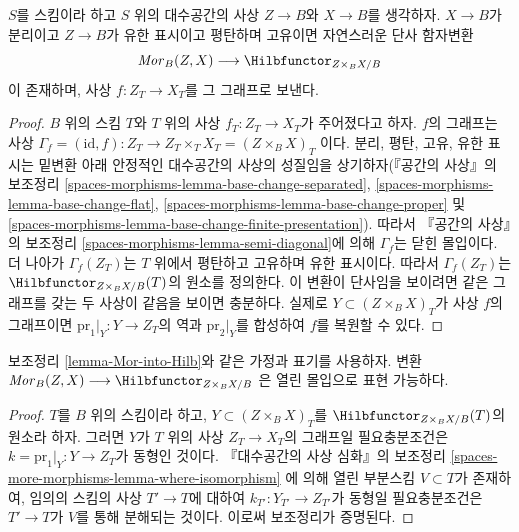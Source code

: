 \begin{lemma}
\label{lemma-Mor-into-Hilb}
$S$를 스킴이라 하고 $S$ 위의 대수공간의 사상
$Z \to B$와 $X \to B$를 생각하자. $X \to B$가 분리이고
$Z \to B$가 유한 표시이고 평탄하며 고유이면 자연스러운 단사 함자변환
$$
\mathit{Mor}_B(Z, X) \longrightarrow \Hilbfunctor_{Z \times_B X/B}
$$
이 존재하며, 사상 $f : Z_T \to X_T$를 그 그래프로 보낸다.
\end{lemma}

\begin{proof}
$B$ 위의 스킴 $T$와 $T$ 위의 사상 $f_T : Z_T \to X_T$가 주어졌다고 하자.
$f$의 그래프는 사상
$\Gamma_f = (\text{id}, f) : Z_T \to Z_T \times_T X_T = (Z \times_B X)_T$
이다. 분리, 평탄, 고유, 유한 표시는 밑변환 아래 안정적인 대수공간의
사상의 성질임을 상기하자(『공간의 사상』의 보조정리
\ref{spaces-morphisms-lemma-base-change-separated},
\ref{spaces-morphisms-lemma-base-change-flat},
\ref{spaces-morphisms-lemma-base-change-proper} 및
\ref{spaces-morphisms-lemma-base-change-finite-presentation}).
따라서 『공간의 사상』의 보조정리
\ref{spaces-morphisms-lemma-semi-diagonal}에 의해 $\Gamma_f$는 닫힌 몰입이다.
더 나아가 $\Gamma_f(Z_T)$는 $T$ 위에서 평탄하고 고유하며 유한 표시이다.
따라서 $\Gamma_f(Z_T)$는 $\Hilbfunctor_{Z \times_B X/B}(T)$의 원소를
정의한다. 이 변환이 단사임을 보이려면 같은 그래프를 갖는 두 사상이
같음을 보이면 충분하다. 실제로 $Y \subset (Z \times_B X)_T$가 사상
$f$의 그래프이면 $\text{pr}_1|_Y : Y \to Z_T$의 역과
$\text{pr}_2|_Y$를 합성하여 $f$를 복원할 수 있다.
\end{proof}

\begin{lemma}
\label{lemma-Mor-into-Hilb-open}
보조정리 \ref{lemma-Mor-into-Hilb}와 같은 가정과 표기를 사용하자. 변환
$\mathit{Mor}_B(Z, X) \longrightarrow \Hilbfunctor_{Z \times_B X/B}$
은 열린 몰입으로 표현 가능하다.
\end{lemma}

\begin{proof}
$T$를 $B$ 위의 스킴이라 하고, $Y \subset (Z \times_B X)_T$를
$\Hilbfunctor_{Z \times_B X/B}(T)$의 원소라 하자. 그러면 $Y$가
$T$ 위의 사상 $Z_T \to X_T$의 그래프일 필요충분조건은
$k = \text{pr}_1|_Y : Y \to Z_T$가 동형인 것이다.
『대수공간의 사상 심화』의 보조정리
\ref{spaces-more-morphisms-lemma-where-isomorphism}
에 의해 열린 부분스킴 $V \subset T$가 존재하여, 임의의 스킴의 사상
$T' \to T$에 대하여 $k_{T'} : Y_{T'} \to Z_{T'}$가 동형일 필요충분조건은
$T' \to T$가 $V$를 통해 분해되는 것이다. 이로써 보조정리가 증명된다.
\end{proof}

